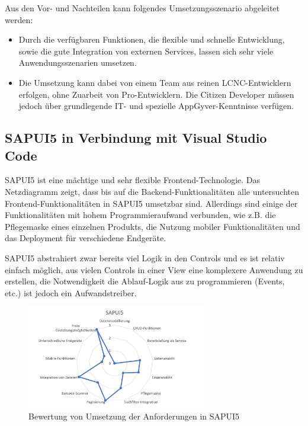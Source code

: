 Aus den Vor- und Nachteilen kann folgendes Umsetzungsszenario abgeleitet werden:
\begin{itemize} 
  \item Durch die verfügbaren Funktionen, die flexible und schnelle Entwicklung, sowie die gute Integration von externen Services, lassen sich sehr viele Anwendungsszenarien umsetzen.
  \item Die Umsetzung kann dabei von einem Team aus reinen LCNC-Entwicklern erfolgen, ohne Zuarbeit von Pro-Entwicklern. Die Citizen Developer müssen jedoch über grundlegende IT- und spezielle AppGyver-Kenntnisse verfügen. 
\end{itemize}

\subsection{SAPUI5 in Verbindung mit Visual Studio Code}
SAPUI5 ist eine mächtige und sehr flexible Frontend-Technologie. Das Netzdiagramm zeigt, dass bis auf die Backend-Funktionalitäten alle untersuchten Frontend-Funktionalitäten in SAPUI5 umsetzbar sind. Allerdings  sind einige der Funktionalitäten mit hohem Programmieraufwand verbunden, wie z.B. die Pflegemaske eines einzelnen Produkts, die Nutzung mobiler Funktionalitäten und das Deployment für verschiedene Endgeräte.

SAPUI5 abstrahiert zwar bereits viel Logik in den Controls und es ist relativ einfach möglich, aus vielen Controls in einer View eine komplexere Anwendung zu erstellen, die Notwendigkeit die Ablauf-Logik aus zu programmieren (Events, etc.) ist jedoch ein Aufwandstreiber.
\begin{figure}[!htbp]
 \centering
 \includegraphics[width=0.7\textwidth]{Bilder/bewertung/ND_UI5.jpg}
 \caption{Bewertung von Umsetzung der Anforderungen in SAPUI5}
\end{figure}

